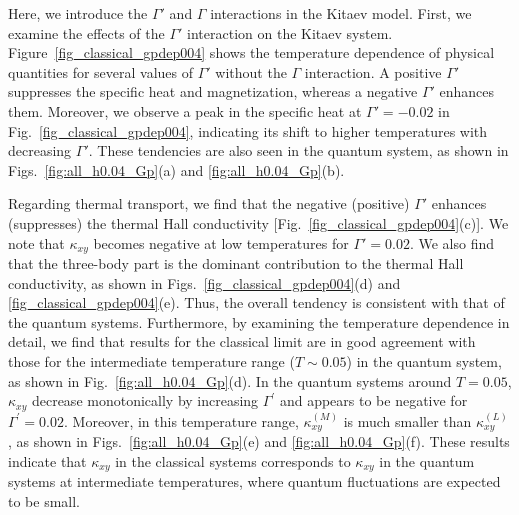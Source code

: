 \documentclass[twocolumn,superscriptaddress,showpacs, longbibliography, aps, prb]{revtex4-2}
\newcommand{\red}[1]{\textcolor{red}{#1}}
\newcommand{\blue}[1]{\textcolor{blue}{#1}}
\newcommand{\orange}[1]{\textcolor{orange}{#1}}
\begin{document}
Here, we introduce the $\Gamma'$ and $\Gamma$ interactions in the Kitaev model.
First, we examine the %
effects of the $\Gamma'$ interaction on the Kitaev system.
Figure~\ref{fig_classical_gpdep004} shows the temperature dependence of physical quantities for several values of $\Gamma'$ %
without the $\Gamma$ interaction.
A positive $\Gamma'$ suppresses the specific heat and magnetization, %
whereas a negative $\Gamma'$ enhances them.
Moreover, we %
observe a peak in the specific heat at $\Gamma'=-0.02$ in Fig.~\ref{fig_classical_gpdep004}, indicating its shift to %
higher temperatures with decreasing $\Gamma'$.
These tendencies are also seen in the quantum system, as shown in Figs.~\ref{fig:all_h0.04_Gp}(a) and \ref{fig:all_h0.04_Gp}(b).

Regarding thermal transport,
we find that the negative (positive) $\Gamma'$ enhances (suppresses) the thermal Hall conductivity [Fig.~\ref{fig_classical_gpdep004}(c)]. We note that $\kappa_{xy}$ becomes 
negative at low temperatures for $\Gamma'=0.02$.
We also find that
the three-body part %
is the dominant contribution to the thermal Hall conductivity, as shown in Figs.~\ref{fig_classical_gpdep004}(d) and \ref{fig_classical_gpdep004}(e).
Thus, the overall tendency is consistent with that of the quantum systems.
Furthermore, by examining the temperature dependence in detail, 
we find that
results for the classical limit %
are %
in good agreement with those for the intermediate temperature range ($T\sim 0.05$) in the quantum system, as
shown in Fig.~\ref{fig:all_h0.04_Gp}(d). %
In the quantum systems around $T=0.05$, 
$\kappa_{xy}$ 
decrease monotonically by increasing $\Gamma^{\prime}$
and %
appears to be negative for $\Gamma^{\prime}=0.02$.
Moreover, in this temperature range, $\kappa_{xy}^{(M)}$ is much smaller than $\kappa_{xy}^{(L)}$, as shown in Figs.~\ref{fig:all_h0.04_Gp}(e) and \ref{fig:all_h0.04_Gp}(f).
These results indicate that $\kappa_{xy}$ in the classical systems corresponds to %
$\kappa_{xy}$ in the 
quantum systems at intermediate temperatures, where %
quantum fluctuations are expected to be small.
\end{document}
